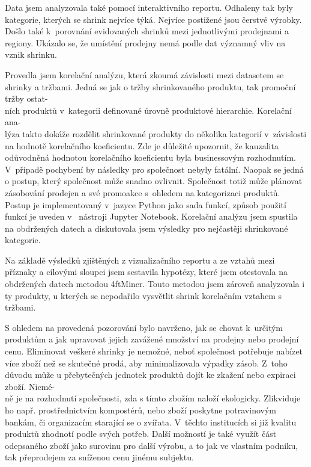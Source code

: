 Data jsem analyzovala také pomocí interaktivního reportu. Odhaleny tak byly kategorie, kterých se shrink nejvíce týká. Nejvíce postižené jsou čerstvé výrobky. Došlo také k~porovnání evidovaných shrinků mezi jednotlivými prodejnami a regiony. Ukázalo se, že umístění prodejny nemá podle dat významný vliv na vznik shrinku. 


Provedla jsem korelační analýzu, která zkoumá závislosti mezi datasetem se shrinky a tržbami. Jedná se jak o tržby shrinkovaného produktu, tak promoční tržby ostat-\\ních produktů v~kategorii definované úrovně produktové hierarchie. Korelační ana-\\lýza takto dokáže rozdělit shrinkované produkty do několika kategorií v~závislosti na hodnotě korelačního koeficientu. Zde je důležité upozornit, že kauzalita odůvodněná hodnotou korelačního koeficientu byla businessovým rozhodnutím. V~případě pochybení by následky pro společnost nebyly fatální. Naopak se jedná o postup, který společnost může snadno ovlivnit. Společnost totiž může plánovat zásobování prodejen a své promoakce s~ohledem na kategorizaci produktů.
Postup je implementovaný v~jazyce Python jako sada funkcí, způsob použití funkcí je uveden v~ nástroji Jupyter Notebook. 
Korelační analýzu jsem spustila na obdržených datech a diskutovala jsem výsledky pro nejčastěji shrinkované kategorie.

Na základě výsledků zjištěných z vizualizačního reportu a ze vztahů mezi příznaky a cílovými sloupci jsem sestavila hypotézy, které jsem otestovala na obdržených datech metodou 4ftMiner. Touto metodou jsem zároveň analyzovala i ty produkty, u kterých se nepodařilo vysvětlit shrink korelačním vztahem s tržbami.

S ohledem  na provedená pozorování bylo navrženo, jak se chovat k~určitým produktům a jak upravovat jejich zavážené množství na prodejny nebo prodejní cenu. Eliminovat veškeré shrinky je nemožné, neboť společnost potřebuje nabízet více zboží než se skutečné prodá, aby minimalizovala výpadky zásob. Z~toho důvodu může u přebytečných jednotek produktů dojít ke zkažení nebo expiraci zboží. Nicmé-\\ně je na rozhodnutí společnosti, zda s tímto zbožím naloží ekologicky. Zlikviduje ho např. prostřednictvím kompostérů, nebo zboží poskytne potravinovým bankám, či organizacím starající se o zvířata. V~těchto institucích si již kvalitu produktů zhodnotí podle svých potřeb. Další možností je také využít část odepsaného zboží jako surovinu pro další výrobu, a to jak ve vlastním podniku, tak přeprodejem za sníženou cenu jinému subjektu.

